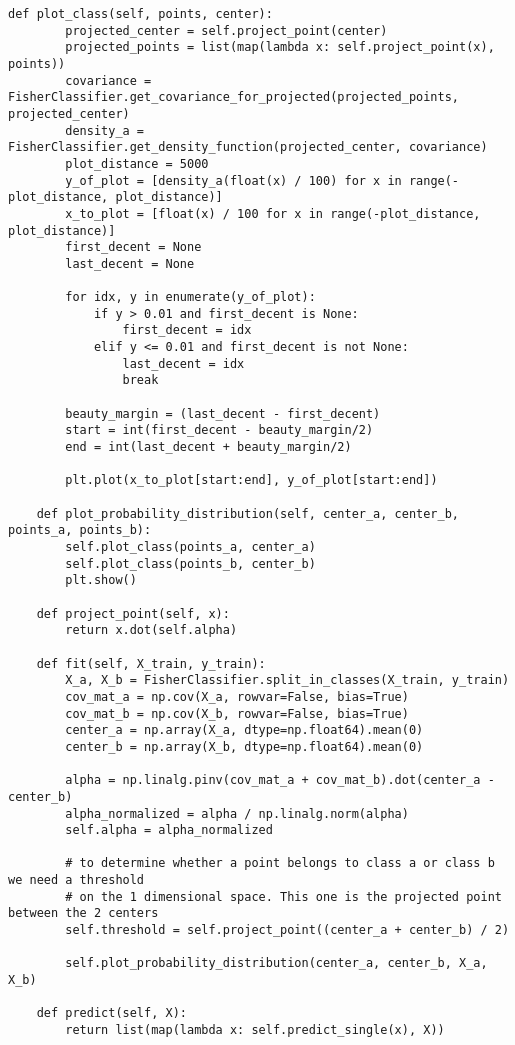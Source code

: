 \begin{lstlisting}[style=py]
    def plot_class(self, points, center):
        projected_center = self.project_point(center)
        projected_points = list(map(lambda x: self.project_point(x), points))
        covariance = FisherClassifier.get_covariance_for_projected(projected_points, projected_center)
        density_a = FisherClassifier.get_density_function(projected_center, covariance)
        plot_distance = 5000
        y_of_plot = [density_a(float(x) / 100) for x in range(-plot_distance, plot_distance)]
        x_to_plot = [float(x) / 100 for x in range(-plot_distance, plot_distance)]
        first_decent = None
        last_decent = None

        for idx, y in enumerate(y_of_plot):
            if y > 0.01 and first_decent is None:
                first_decent = idx
            elif y <= 0.01 and first_decent is not None:
                last_decent = idx
                break

        beauty_margin = (last_decent - first_decent)
        start = int(first_decent - beauty_margin/2)
        end = int(last_decent + beauty_margin/2)

        plt.plot(x_to_plot[start:end], y_of_plot[start:end])

    def plot_probability_distribution(self, center_a, center_b, points_a, points_b):
        self.plot_class(points_a, center_a)
        self.plot_class(points_b, center_b)
        plt.show()

    def project_point(self, x):
        return x.dot(self.alpha)

    def fit(self, X_train, y_train):
        X_a, X_b = FisherClassifier.split_in_classes(X_train, y_train)
        cov_mat_a = np.cov(X_a, rowvar=False, bias=True)
        cov_mat_b = np.cov(X_b, rowvar=False, bias=True)
        center_a = np.array(X_a, dtype=np.float64).mean(0)
        center_b = np.array(X_b, dtype=np.float64).mean(0)

        alpha = np.linalg.pinv(cov_mat_a + cov_mat_b).dot(center_a - center_b)
        alpha_normalized = alpha / np.linalg.norm(alpha)
        self.alpha = alpha_normalized

        # to determine whether a point belongs to class a or class b we need a threshold
        # on the 1 dimensional space. This one is the projected point between the 2 centers
        self.threshold = self.project_point((center_a + center_b) / 2)

        self.plot_probability_distribution(center_a, center_b, X_a, X_b)

    def predict(self, X):
        return list(map(lambda x: self.predict_single(x), X))


\end{lstlisting}

